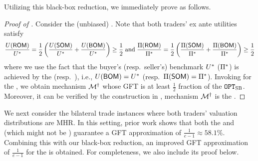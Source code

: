 Utilizing this black-box reduction,  we immediately prove  as follows. 
\begin{proof}[Proof of ]
    Consider the (unbiased) {\RandomOffer}. Note that both traders' ex ante utilities satisfy
    \begin{align*}
        \frac{U({\sf ROM})}{U^*}
        =
        \frac{1}{2} \left(\frac{U({\sf SOM})}{U^*}
        +
        \frac{U({\sf BOM})}{U^*}\right)
        \geq 
        \frac{1}{2}
        \;
        \mbox{and}
        \;
        \frac{\Pi({\sf ROM})}{\Pi^*}
        =
        \frac{1}{2} \left(\frac{\Pi({\sf SOM})}{\Pi^*}
        +\frac{\Pi({\sf BOM})}{\Pi^*}
        \right)
        \geq 
        \frac{1}{2}
    \end{align*}    
    where we use the fact that the buyer's (resp.\ seller's) benchmark $U^*$ ($\Pi^*$) is achieved by the {\BuyerOffer} (resp.\ {\SellerOffer}), i.e., $U({\sf BOM}) = U^*$ (resp.\ $\Pi({\sf SOM}) = \Pi^*$). Invoking  for the {\RandomOffer}, we obtain {\ksfair} mechanism $\mathcal{M}^\dagger$ whose GFT is at least $\frac{1}{2}$ fraction of the {\SecondBest} $\texttt{OPT}_{\textsc{SB}}$. Moreover, it can be verified by the construction in , mechanism $\mathcal{M}^\dagger$ is the {\BiasedRandomOffer}. 
\end{proof}


We next consider the bilateral trade instances where both traders' valuation distributions are MHR. In this setting, prior work \citep{Fei-22} shows that both the {\BuyerOffer} and {\SellerOffer} (which might not be {\ksfair}) guarantee a GFT approximation of $\frac{1}{e - 1}\approx 58.1\%$. Combining this with our black-box reduction, an improved GFT approximation of $\frac{1}{e - 1}$ for the {\ksfair} {\BiasedRandomOffer} is obtained. For completeness, we also include its proof below.

